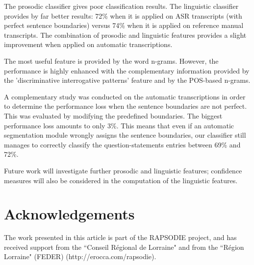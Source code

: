 \documentclass[conference]{IEEEtran}
\begin{document}
The prosodic classifier gives poor classification results. 
The linguistic classifier provides by far better results: 72\% when it is applied on ASR transcripts (with perfect sentence boundaries) versus 74\% when it is applied on reference manual transcripts. The combination of prosodic and linguistic features provides a slight improvement when applied on automatic transcriptions.

The most useful feature is provided by the word n-grams. However, the performance is highly enhanced with the complementary information provided by the 'discriminative interrogative patterns' feature and by the POS-based n-grams. 

A complementary study was conducted on the automatic transcriptions in order to determine the performance loss when the sentence boundaries are not perfect. 
This was evaluated by modifying the predefined boundaries.
The biggest performance loss amounts to only 3\%. 
This means that even if an automatic segmentation module wrongly assigns the sentence boundaries, our classifier still manages to correctly classify the question-statements entries between 69\% and 72\%.     
  
Future work will investigate further prosodic and linguistic features; confidence measures will also be considered in the computation of the linguistic features.


\section*{Acknowledgements}

The work presented in this article is part of the RAPSODIE project, and has received
support from the ``Conseil R\'{e}gional de Lorraine" and from the ``R\'{e}gion Lorraine" (FEDER) (http://erocca.com/rapsodie).








\end{document}
